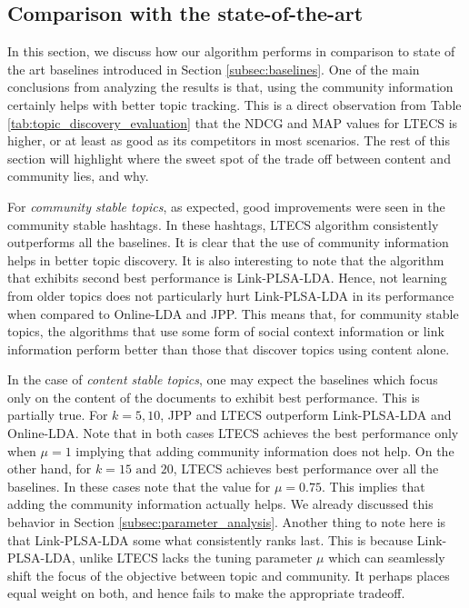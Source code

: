 \subsection{Comparison with the state-of-the-art}
\label{subsec:topic_discovery_experiments}
In this section, we discuss how our algorithm performs in 
comparison to state of the art baselines introduced in Section \ref{subsec:baselines}.
One of the main conclusions from analyzing the results is that, using the community
information certainly helps with better topic tracking.  This is a direct observation
from Table \ref{tab:topic_discovery_evaluation} that the NDCG and MAP values for LTECS
is higher, or at least as good as its competitors in most scenarios.  The rest of this section
will highlight where the sweet spot of the trade off between content and community
lies, and why.

For \emph{community stable topics}, as expected, good improvements were seen in the community stable hashtags.  In these hashtags,
LTECS algorithm consistently outperforms all the baselines.  It is clear that
the use of community information helps in better topic discovery.  It is also interesting
to note that the algorithm that exhibits second best performance is Link-PLSA-LDA.  
Hence, not learning from older topics does not particularly hurt Link-PLSA-LDA
in its performance when compared to Online-LDA and JPP.  This means that, for community stable topics, 
the algorithms that use some form
of social context information or link information perform better than those that discover topics using
content alone.

In the case of \emph{content stable topics}, one may expect the baselines which focus only
on the content of the documents to exhibit best performance.  This is partially true.  For $k = 5,10$,
JPP and LTECS outperform Link-PLSA-LDA and Online-LDA.  Note that in both cases
LTECS achieves the best performance only when $\mu = 1$ implying that adding community information
does not help.  On the other hand, for $k = 15 \text{ and } 20$, LTECS achieves best performance
over all the baselines.  In these cases note that the value for $\mu = 0.75$.  This implies
that adding the community information actually helps.  We already discussed this behavior in Section \ref{subsec:parameter_analysis}.
 Another thing to note here is that Link-PLSA-LDA some what consistently ranks last.  This is because
Link-PLSA-LDA, unlike LTECS lacks the tuning parameter $\mu$ which can seamlessly shift the focus of the
objective between topic and community.  It perhaps places equal weight on both, and hence fails to
make the appropriate tradeoff.

